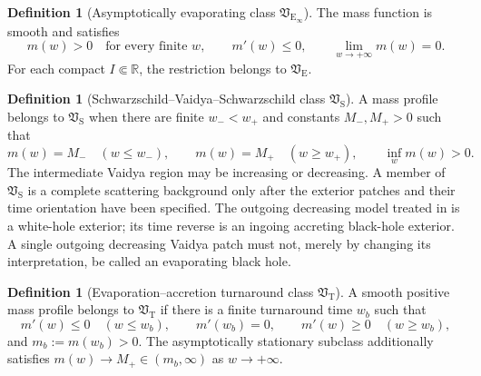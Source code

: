 \documentclass[11pt,a4paper]{article}
\theoremstyle{definition}
\newtheorem{definition}[theorem]{Definition}
\theoremstyle{remark}
\begin{document}
	\begin{definition}[Asymptotically evaporating class
		$\mathfrak V_{\mathrm E_\infty}$]
		The mass function is smooth and satisfies
		\begin{equation}
			m(w)>0 \quad\text{for every finite }w,
			\qquad m'(w)\leq0,
			\qquad \lim_{w\to+\infty}m(w)=0.
			\label{eq:asymptotic-evaporation}
		\end{equation}
		For each compact $I\Subset\mathbb R$, the restriction belongs to
		$\mathfrak V_{\mathrm E}$.
	\end{definition}
	
	\begin{definition}[Schwarzschild--Vaidya--Schwarzschild class
		$\mathfrak V_{\mathrm S}$]
		\label{def:sandwich}
		A mass profile belongs to $\mathfrak V_{\mathrm S}$ when there are finite
		$w_-<w_+$ and constants $M_-,M_+>0$ such that
		\begin{equation}
			m(w)=M_-\quad(w\leq w_-),
			\qquad
			m(w)=M_+\quad(w\geq w_+),
			\qquad
			\inf_w m(w)>0.
			\label{eq:sandwich-profile}
		\end{equation}
		The intermediate Vaidya region may be increasing or decreasing.  A member of
		$\mathfrak V_{\mathrm S}$ is a complete scattering background only after the
		exterior patches and their time orientation have been specified.  The
		outgoing decreasing model treated in \cite{Coudray2024} is a white-hole
		exterior; its time reverse is an ingoing accreting black-hole exterior.  A
		single outgoing decreasing Vaidya patch must not, merely by changing its
		interpretation, be called an evaporating black hole.
	\end{definition}
	
	\begin{definition}[Evaporation--accretion turnaround class
		$\mathfrak V_{\mathrm T}$]
		\label{def:turnaround}
		A smooth positive mass profile belongs to $\mathfrak V_{\mathrm T}$ if there
		is a finite turnaround time $w_b$ such that
		\begin{equation}
			m'(w)\leq0\quad(w\leq w_b),\qquad
			m'(w_b)=0,\qquad
			m'(w)\geq0\quad(w\geq w_b),
			\label{eq:turnaround-signs}
		\end{equation}
		and $m_b:=m(w_b)>0$.  The asymptotically stationary subclass additionally
		satisfies $m(w)\to M_+\in(m_b,\infty)$ as $w\to+\infty$.
	\end{definition}
	
\end{document}
